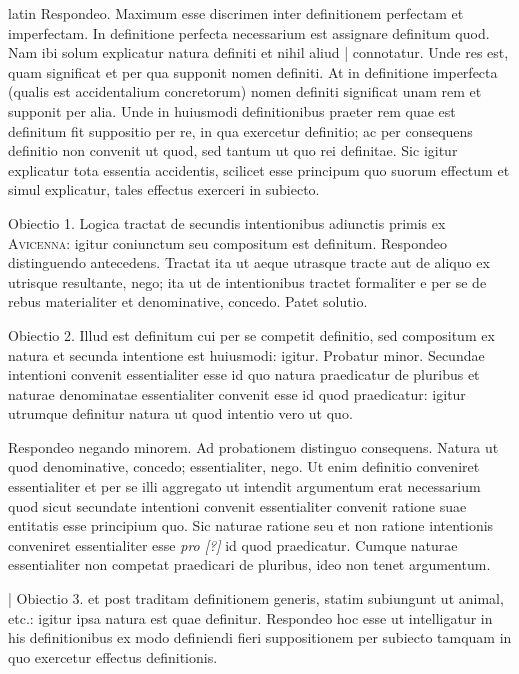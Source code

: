 \begin{otherlanguage*}{latin}
\pstart
Respondeo. Maximum esse discrimen inter definitionem perfectam et imperfectam. In definitione perfecta necessarium est assignare definitum quod. Nam ibi solum explicatur natura definiti et nihil aliud \textnormal{|} connotatur. Unde res est, quam significat et per qua supponit nomen definiti. At in definitione imperfecta (qualis est accidentalium concretorum) nomen definiti significat unam rem et supponit per alia. Unde in huiusmodi definitionibus praeter rem quae est definitum fit suppositio per re, in qua exercetur definitio; ac per consequens definitio non convenit ut quod, sed tantum ut quo rei definitae. Sic igitur explicatur tota essentia accidentis, scilicet esse principum quo suorum effectum et simul explicatur, tales effectus exerceri in subiecto. 
\pend

\pstart
Obiectio 1. Logica tractat de secundis intentionibus adiunctis primis ex \textsc{Avicenna}:
igitur coniunctum seu compositum est definitum. Respondeo distinguendo antecedens. Tractat ita ut aeque utrasque tracte aut de aliquo ex utrisque resultante, nego; ita ut de intentionibus tractet formaliter e per se de rebus materialiter et denominative, concedo. Patet solutio. 
\pend

\pstart
Obiectio 2. Illud est definitum cui per se competit definitio, sed compositum ex natura et secunda intentione est huiusmodi:
igitur. Probatur minor. Secundae intentioni convenit essentialiter esse id quo natura praedicatur de pluribus et naturae denominatae essentialiter convenit esse id quod praedicatur:
igitur utrumque definitur natura ut quod intentio vero ut quo. 
\pend

\pstart
Respondeo negando minorem. Ad probationem distinguo consequens. Natura ut quod denominative, concedo; essentialiter, nego. Ut enim definitio conveniret essentialiter et per se illi aggregato ut intendit argumentum erat necessarium quod sicut secundate intentioni convenit essentialiter convenit ratione suae entitatis esse principium quo. Sic naturae ratione seu et non ratione intentionis conveniret essentialiter esse \emph{pro [?]} id quod praedicatur. Cumque naturae essentialiter non competat praedicari de pluribus, ideo non tenet argumentum. 
\pend

\pstart
\textnormal{|} Obiectio 3.  et  post traditam definitionem generis, statim subiungunt ut animal, etc.:
igitur ipsa natura est quae definitur. Respondeo hoc esse ut intelligatur in his definitionibus ex modo definiendi fieri suppositionem per subiecto tamquam in quo exercetur effectus definitionis. 
\pend


\end{otherlanguage*}
